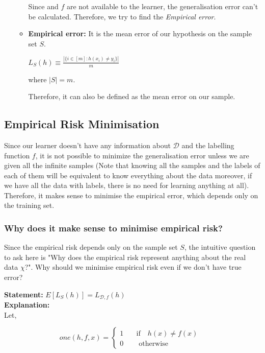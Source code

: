 \documentclass[a4paper]{article}
\begin{document}
\begin{itemize}
\begin{itemize}
            Since  and $f$ are not available to the learner, the generalisation error can't be calculated. Therefore, we try to find the \textit{Empirical error}.
            \item \textbf{Empirical error: } It is the mean error of our hypothesis on the sample set $S$.
                \begin{center}
                    $L_S(h) \equiv \frac{|\{i\in[m]:h(x_i) \neq y_i\}|}{m}$
                \end{center}
            where $|S| = m$.
            
            Therefore, it can also be defined as the mean error on our sample.
            
        \end{itemize}
        \end{itemize}
        \newpage
        
    \subsection{Empirical Risk Minimisation}
    Since our learner doesn't have any information about $\mathcal{D}$ and the labelling function $f$, it is not possible to minimize the generalisation error unless we are given all the infinite samples (Note that knowing all the samples and the labels of each of them will be equivalent to know everything about the data moreover, if we have all the data with labels, there is no need for learning anything at all). Therefore, it makes sense to minimise the empirical error, which depends only on the training set.
        \subsubsection{Why does it make sense to minimise empirical risk?}
        Since the empirical risk depends only on the sample set $S$, the intuitive question to ask here is "Why does the empirical risk represent anything about the real data $\chi$?". Why should we minimise empirical risk even if we don't have true error?
        
        \textbf{Statement: } $E[L_S(h)] = L_{\mathcal{D},f}(h)$ \\
        \textbf{Explanation: } \\
            Let,
            \begin{center}
              
            \[ one(h,f,x) =
                  \begin{cases}
                    1   & \quad \text{if }\text{ $h(x) \neq f(x)$ }\\
                    0  & \quad \text{ otherwise}
                  \end{cases}
                \]
            \end{center}
            
\end{document}
